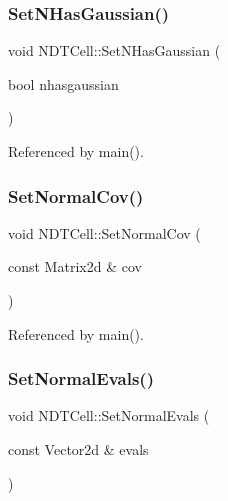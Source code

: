\subsubsection{\texorpdfstring{Set\+N\+Has\+Gaussian()}{SetNHasGaussian()}}
{\footnotesize\ttfamily void N\+D\+T\+Cell\+::\+Set\+N\+Has\+Gaussian (\begin{DoxyParamCaption}\item[{bool}]{nhasgaussian }\end{DoxyParamCaption})\hspace{0.3cm}{\ttfamily [inline]}}



Referenced by main().

\mbox{\label{classNDTCell_a18ac3bd685318520b21bd015e8c94ef3}} 
\subsubsection{\texorpdfstring{Set\+Normal\+Cov()}{SetNormalCov()}}
{\footnotesize\ttfamily void N\+D\+T\+Cell\+::\+Set\+Normal\+Cov (\begin{DoxyParamCaption}\item[{const Matrix2d \&}]{cov }\end{DoxyParamCaption})\hspace{0.3cm}{\ttfamily [inline]}}



Referenced by main().

\mbox{\label{classNDTCell_a345105fcf5addd6802e4769619e3532d}} 
\subsubsection{\texorpdfstring{Set\+Normal\+Evals()}{SetNormalEvals()}}
{\footnotesize\ttfamily void N\+D\+T\+Cell\+::\+Set\+Normal\+Evals (\begin{DoxyParamCaption}\item[{const Vector2d \&}]{evals }\end{DoxyParamCaption})\hspace{0.3cm}{\ttfamily [inline]}}

